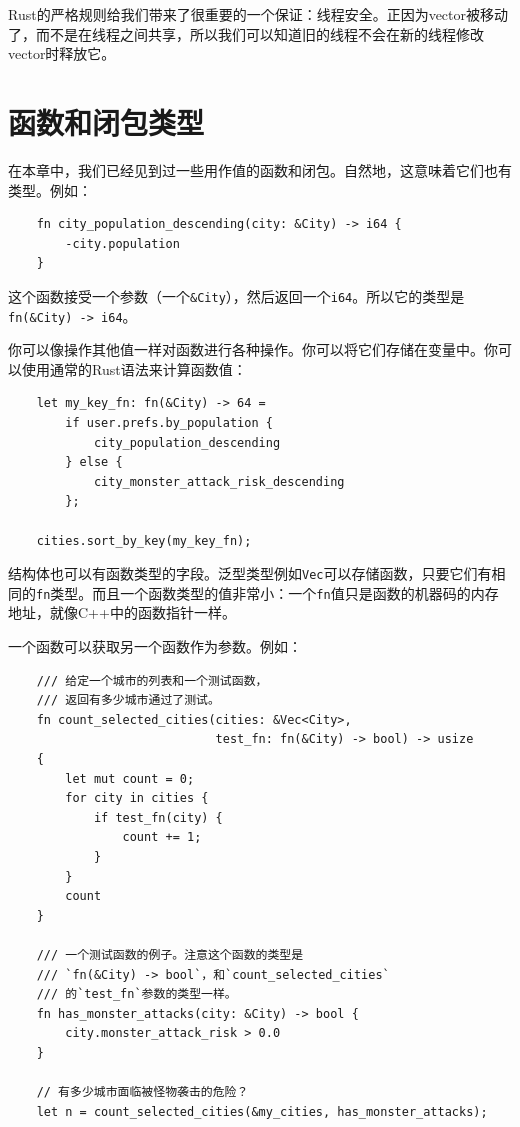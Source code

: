 Rust的严格规则给我们带来了很重要的一个保证：线程安全。正因为vector被移动了，而不是在线程之间共享，所以我们可以知道旧的线程不会在新的线程修改vector时释放它。

\section{函数和闭包类型}\label{fn}

在本章中，我们已经见到过一些用作值的函数和闭包。自然地，这意味着它们也有类型。例如：
\begin{verbatim}
    fn city_population_descending(city: &City) -> i64 {
        -city.population
    }
\end{verbatim}

这个函数接受一个参数（一个\texttt{\&City}），然后返回一个\texttt{i64}。所以它的类型是\texttt{fn(\&City) -> i64}。

你可以像操作其他值一样对函数进行各种操作。你可以将它们存储在变量中。你可以使用通常的Rust语法来计算函数值：
\begin{verbatim}
    let my_key_fn: fn(&City) -> 64 =
        if user.prefs.by_population {
            city_population_descending
        } else {
            city_monster_attack_risk_descending
        };
    
    cities.sort_by_key(my_key_fn);
\end{verbatim}

结构体也可以有函数类型的字段。泛型类型例如\texttt{Vec}可以存储函数，只要它们有相同的\texttt{fn}类型。而且一个函数类型的值非常小：一个\texttt{fn}值只是函数的机器码的内存地址，就像C++中的函数指针一样。

一个函数可以获取另一个函数作为参数。例如：
\begin{verbatim}
    /// 给定一个城市的列表和一个测试函数，
    /// 返回有多少城市通过了测试。
    fn count_selected_cities(cities: &Vec<City>,
                             test_fn: fn(&City) -> bool) -> usize
    {
        let mut count = 0;
        for city in cities {
            if test_fn(city) {
                count += 1;
            }
        }
        count
    }

    /// 一个测试函数的例子。注意这个函数的类型是
    /// `fn(&City) -> bool`，和`count_selected_cities`
    /// 的`test_fn`参数的类型一样。
    fn has_monster_attacks(city: &City) -> bool {
        city.monster_attack_risk > 0.0
    }

    // 有多少城市面临被怪物袭击的危险？
    let n = count_selected_cities(&my_cities, has_monster_attacks);
\end{verbatim}

